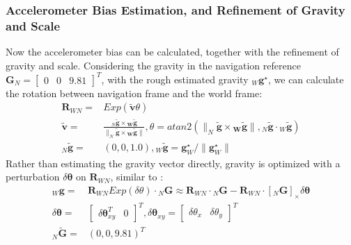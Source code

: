 \documentclass[journal,article,submit,moreauthors,pdftex]{Definitions/mdpi}
\begin{document}
\subsubsection{Accelerometer Bias Estimation, and Refinement of Gravity and Scale}
Now the accelerometer bias can be calculated, together with the refinement of 
gravity and scale.
Considering the gravity in the navigation reference $\boldsymbol{G}_{N} = \left[\begin{matrix} 0 & 0 & 9.81 \end{matrix}\right]^T$,
with the rough estimated gravity ${_W}\boldsymbol{g}^{\star}$, we can calculate the 
rotation between navigation frame and the world frame:
\begin{equation}
	\begin{aligned}
		\boldsymbol{R}_{WN} =      & Exp(\tilde{\boldsymbol{v}}\theta)                                                                                                                                                                                                                                       \\
		\tilde{\boldsymbol{v}} =   & \frac{_N\boldsymbol{\tilde{g}\times {_W\boldsymbol{\tilde{g}}}}}{\| _N\boldsymbol{\tilde{g}\times{_W\boldsymbol{\tilde{g}}}}\|}, \theta = atan2(\|_N\boldsymbol{\tilde{g}\times{_W\boldsymbol{\tilde{g}}}}\|,{_N\boldsymbol{\tilde{g}}\cdot{_W\boldsymbol{\tilde{g}}}}) \\
		_N\boldsymbol{\tilde{g}} = & (0,0,1.0),{_W\boldsymbol{\tilde{g}}} = \boldsymbol{g}_W^{\star}/\| \boldsymbol{g}_W^{\star}\|                                                                                                                                                                           
	\end{aligned}
\end{equation}
Rather than estimating the gravity vector directly, gravity is optimized with a 
perturbation $\delta\boldsymbol{\theta}$ on $\boldsymbol{R}_{WN}$, similar to 
\cite{mur-artalVisualInertialMonocularSLAM2017a}:
\begin{equation}
	\begin{aligned}
		_W\boldsymbol{g} = & \boldsymbol{R}_{WN}Exp(\delta\theta)\cdot {_N\boldsymbol{G}} \approx \boldsymbol{R}_{WN} \cdot { _N\boldsymbol{G}} - \boldsymbol{R}_{WN}\cdot [{ _N\boldsymbol{G}} ]_{\times} \delta\boldsymbol{\theta} \\
		\delta\boldsymbol{\theta} = & [\begin{matrix} \delta\boldsymbol{\theta}_{xy}^T & 0\end{matrix}]^T ,\delta\boldsymbol{\theta}_{xy} = [\begin{matrix} \delta{\theta}_{x} & \delta{\theta}_{y}\end{matrix}]^T \\
		_N\boldsymbol{\tilde{G}} = & (0,0,9.81)^T    
	\end{aligned}
	\label{gravity expression}
\end{equation}
\end{document}
